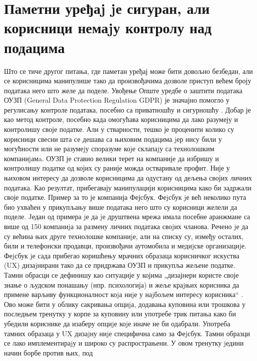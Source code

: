 \documentclass[a4paper]{article}
\begin{document}
\section{Паметни уређаj jе сигуран, али корисници немаjу контролу над подацима}
Што се тиче другог питања, где паметан уређај може бити довољно безбедан, али се корисницима манипулише тако да произвођачима дозволе приступ
већем броју података него што желе да поделе. Увођење Опште уредбе о заштити података ОУЗП (General Data Protection Regulation GDPR)  је значајно помогло у регулисању контроле података,
посебно са приватношћу и сигурношћу \cite{7}. Добар је као метод контроле, посебно када омогућава корисницима да лако разумеју и контролишу своје податке.
Али у стварности, тешко је проценити колико су корисници свесни шта се дешава са њиховим подацима jер нису били у могућности или не разумеjу споразуме
коjе склапаjу са технолошким компаниjамa. ОУЗП је ставио велики терет на компаније да избришу и контролишу податке од којих су раније можда остваривале профит.
Није у њиховом интересу да дозволе корисницима да одустану од дељења својих личних података. Као резултат, прибегавају манипулацији корисницима како
би задржали своје податке.
\newline  \newline
Пример за то је компанија Фејсбук. Феjсбук jе већ неколико пута био ухваћен у прикупљању више података него што су корисници желели да поделе. Jедан од примера
jе да jе друштвена мрежа имала посебне аранжмане са више од 150 компаниjа за размену личних података своjих чланова. Речено jе да су већина њих друге технолошке компаниjе, 
али на списку су, између осталих, били и телефонски продавци, произвођачи аутомобила и медиjске организациjе. Феjсбук jе сада прибегао коришћењу
мрачних образаца корисничког искуства (UX) дизаjнирани тако да се придржава ОУЗП и прикупља жељене податке. Тамни обрасци се дефинишу као ситуације у којима
„дизајнери користе своје знање о људском понашању (нпр. психологија) и жеље краjњих корисника да примене варљиву функционалност коjа ниjе у наjбољем интересу корисника“ \cite{8}.
Ово може бити у облику сакривања опциjа, додавања куповина или трошкова у последњем тренутку у корпе за куповину или употребе трик питања како би убедили кориснике да изаберу опциjе коjе иначе не би одабрали.
\newline  \newline
Употреба тамних образаца у UX дизаjну ниjе специфична само за Феjсбук. Тамни образци се лако имплементираjу и широко су распрострањени. У овом тренутку jедини начин борбе против њих, под
\end{document}
